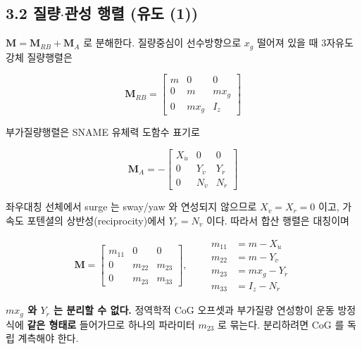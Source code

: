 \documentclass[10pt,a4paper]{article}
\begin{document}
\subsection*{3.2 질량$\cdot$관성 행렬 (유도 (1))}

$\mathbf{M} = \mathbf{M}_{RB} + \mathbf{M}_A$ 로 분해한다. 질량중심이 선수방향으로 $x_g$ 떨어져 있을 때 3자유도 강체 질량행렬은

\begin{equation*}
\mathbf{M}_{RB} = \begin{bmatrix}
m & 0 & 0 \\
0 & m & m x_g \\
0 & m x_g & I_z
\end{bmatrix} \tag{8}
\end{equation*}

부가질량행렬은 SNAME 유체력 도함수 표기로

\begin{equation*}
\mathbf{M}_A = -\begin{bmatrix}
X_{\dot u} & 0 & 0 \\
0 & Y_{\dot v} & Y_{\dot r} \\
0 & N_{\dot v} & N_{\dot r}
\end{bmatrix} \tag{9}
\end{equation*}

좌우대칭 선체에서 surge 는 sway/yaw 와 연성되지 않으므로 $X_{\dot v} = X_{\dot r} = 0$ 이고, 가속도 포텐셜의 상반성(reciprocity)에서 $Y_{\dot r} = N_{\dot v}$ 이다. 따라서 합산 행렬은 대칭이며

\begin{equation*}
\mathbf{M} = \begin{bmatrix}
m_{11} & 0 & 0 \\
0 & m_{22} & m_{23} \\
0 & m_{23} & m_{33}
\end{bmatrix},
\qquad
\begin{aligned}
m_{11} &= m - X_{\dot u} \\
m_{22} &= m - Y_{\dot v} \\
m_{23} &= m x_g - Y_{\dot r} \\
m_{33} &= I_z - N_{\dot r}
\end{aligned} \tag{10}
\end{equation*}

\textbf{$m x_g$ 와 $Y_{\dot r}$ 는 분리할 수 없다.} 정역학적 CoG 오프셋과 부가질량 연성항이 운동 방정식에 \textbf{같은 형태로} 들어가므로 하나의 파라미터 $m_{23}$ 로 묶는다. 분리하려면 CoG 를 독립 계측해야 한다.
\end{document}
